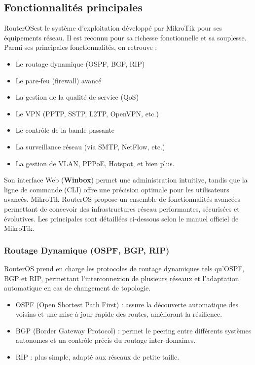 \subsection{ Fonctionnalités principales}
\gls{RouterOS}est le système d'exploitation développé par MikroTik pour ses équipements 
réseau. Il est reconnu pour sa richesse fonctionnelle et sa souplesse. Parmi ses 
principales fonctionnalités, on retrouve :
\begin{itemize}
    \item Le routage dynamique (\gls{OSPF}, \gls{BGP}, \gls{RIP})
    \item Le pare-feu (firewall) avancé
    \item La gestion de la qualité de service (\gls{QoS})
    \item Le \gls{VPN} (\gls{PPTP}, \gls{SSTP}, \gls{L2TP}, \gls{OpenVPN}, etc.)
    \item Le contrôle de la bande passante
    \item La surveillance réseau (via \gls{SMTP}, NetFlow, etc.)
    \item La gestion de \gls{VLAN}, \gls{PPPoE}, Hotspot, et bien plus.
\end{itemize}

Son interface Web (\textbf{Winbox}) permet une administration intuitive, tandis que la ligne 
de commande (\gls{CLI}) offre une précision optimale pour les utilisateurs avancés. 
MikroTik RouterOS propose un ensemble de fonctionnalités avancées permettant de 
concevoir des infrastructures réseau performantes, sécurisées et évolutives. Les 
principales sont détaillées ci-dessous selon le manuel officiel de MikroTik.

\subsubsection*{Routage Dynamique (\gls{OSPF}, \gls{BGP}, \gls{RIP})}
\gls{RouterOS} prend en charge les protocoles de routage dynamiques tels qu’\gls{OSPF}, \gls{BGP} 
et \gls{RIP}, permettant l’interconnexion de plusieurs réseaux et l’adaptation automatique 
en cas de changement de topologie. 
\begin{itemize}
    \item \gls{OSPF} (Open Shortest Path First) : assure la découverte automatique des voisins 
    et une mise à jour rapide des routes, améliorant la résilience.
    \item \gls{BGP} (Border Gateway Protocol) : permet le peering entre différents systèmes 
    autonomes et un contrôle précis du routage inter-domaines.
    \item \gls{RIP} : plus simple, adapté aux réseaux de petite taille.
\end{itemize}

